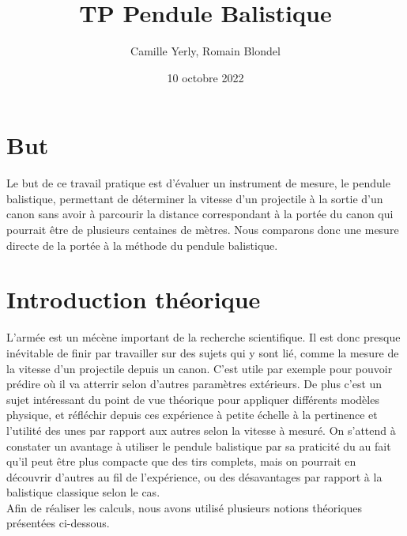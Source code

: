 \documentclass[11pt]{article}
\title{\textbf{TP Pendule Balistique}}
\author{Camille Yerly, Romain Blondel}
\affil{2M8, Gymnase Auguste Piccard}
\date{10 octobre 2022}
\begin{document}
\maketitle

\section{But}
Le but de ce travail pratique est d'évaluer un instrument de mesure, le pendule balistique, permettant de déterminer la vitesse d'un projectile à la sortie d'un canon sans avoir à parcourir la distance correspondant à la portée du canon qui pourrait être de plusieurs centaines de mètres. Nous comparons donc une mesure directe de la portée à la méthode du pendule balistique.

\section{Introduction théorique}
L'armée est un mécène important de la recherche scientifique. Il est donc presque inévitable de finir par travailler sur des sujets qui y sont lié, comme la mesure de la vitesse d'un projectile depuis un canon. C'est utile par exemple pour pouvoir prédire où il va atterrir selon d'autres paramètres extérieurs. De plus c'est un sujet intéressant du point de vue théorique pour appliquer différents modèles physique, et réfléchir depuis ces expérience à petite échelle à la pertinence et l'utilité des unes par rapport aux autres selon la vitesse à mesuré. On s'attend à constater un avantage à utiliser le pendule balistique par sa praticité du au fait qu'il peut être plus compacte que des tirs complets, mais on pourrait en découvrir d'autres au fil de l'expérience, ou des désavantages par rapport à la balistique classique selon le cas.
\\
Afin de réaliser les calculs, nous avons utilisé plusieurs notions théoriques présentées ci-dessous.
\end{document}
